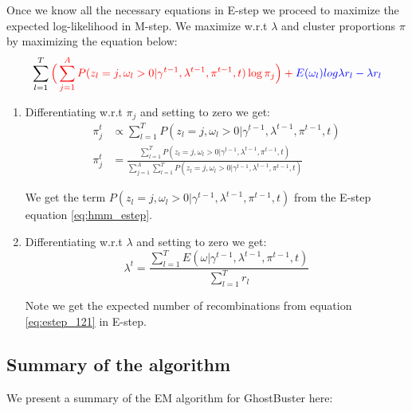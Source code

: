 Once we know all the necessary equations in E-step we proceed to maximize the expected log-likelihood in M-step. We maximize w.r.t $\lambda$ and cluster proportions $\pi$ by maximizing the equation below: 
\begin{equation}
    \sum\limits_{l=1}^{T}  \color{red}{ \Big( \sum\limits_{j=1}^{A} P(z_l = j, \omega_l > 0 \vert \gamma^{t-1}, \lambda^{t-1}, \pi^{t-1}, t) \log \pi_j} \Big) + \color{blue}{E(\omega_l) log \lambda r_l - \lambda r_l }
\end{equation}

\begin{enumerate}
    \item Differentiating w.r.t $\pi_j$ and setting to zero we get:  
    \begin{align}
        \pi^{t}_j &\propto \sum\limits_{l=1}^{T} P(z_l = j, \omega_l > 0 \vert \gamma^{t-1}, \lambda^{t-1}, \pi^{t-1}, t) \nonumber \\
        \pi^{t}_j &= \frac{\sum\limits_{l=1}^{T} P(z_l = j, \omega_l > 0 \vert \gamma^{t-1}, \lambda^{t-1}, \pi^{t-1}, t)}{\sum\limits_{j=1}^{A} \sum\limits_{l=1}^{T} P(z_l = j, \omega_l > 0 \vert \gamma^{t-1}, \lambda^{t-1}, \pi^{t-1}, t)}
    \label{eq:pi_updates}
    \end{align}
    
    We get the term $P(z_l = j, \omega_l > 0 \vert \gamma^{t-1}, \lambda^{t-1}, \pi^{t-1}, t)$ from the E-step equation \ref{eq:hmm_estep}. 
    \item Differentiating w.r.t $\lambda$ and setting to zero we get:
    \begin{equation}
        \lambda^t = \frac{\sum\limits_{l=1}^{T}E(\omega \vert \gamma^{t-1}, \lambda^{t-1}, \pi^{t-1}, t)}{\sum\limits_{l=1}^{T}r_l}
    \label{eq:lambda_updates}
    \end{equation}
    
    Note we get the expected number of recombinations from equation \ref{eq:estep_121} in E-step.
    
\end{enumerate}

\clearpage

\subsection{Summary of the algorithm}
We present a summary of the EM algorithm for GhostBuster here:

